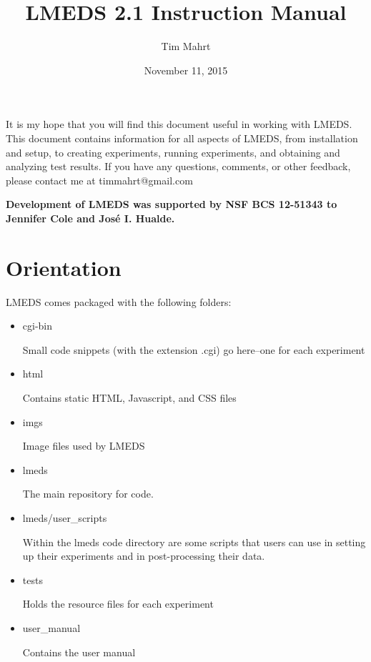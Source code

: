 \documentclass[12pt, oneside]{scrbook}   	%
\title{LMEDS 2.1 Instruction Manual}
\author{Tim Mahrt}
\date{November 11, 2015}
\begin{document}
\maketitle

\newpage

\paragraph{}

It is my hope that you will find this document useful in working with LMEDS. This document contains information for all aspects of LMEDS, from installation and setup, to creating experiments, running experiments, and obtaining and analyzing test results.  If you have any questions, comments, or other feedback, please contact me at timmahrt@gmail.com

\vfill

\begin{tcolorbox}[breakable,colback=white,colframe=green,width=\dimexpr\textwidth+12mm\relax,enlarge left by=-6mm]

\textbf{Development of LMEDS was supported by NSF BCS 12-51343 to Jennifer Cole and José I. Hualde.}

\end{tcolorbox}

\tableofcontents

\newpage

\section{Orientation}

LMEDS comes packaged with the following folders:

\begin{itemize}
\item cgi-bin

Small code snippets (with the extension .cgi) go here--one for each experiment

\item html

Contains static HTML, Javascript, and CSS files

\item imgs

Image files used by LMEDS

\item lmeds

The main repository for code.

\item lmeds/user\_scripts

Within the lmeds code directory are some scripts that users can use in setting up their experiments and in post-processing their data.

\item tests

Holds the resource files for each experiment

\item user\_manual

Contains the user manual

\end{itemize}
\end{document}
